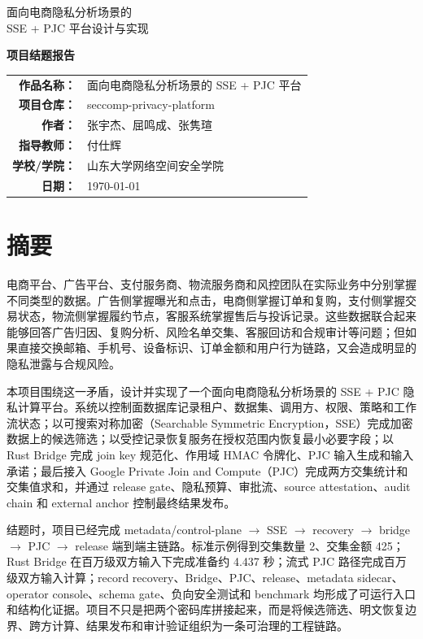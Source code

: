 \documentclass[UTF8,a4paper,12pt,oneside]{ctexrep}
\newcommand{\project}{seccomp-privacy-platform}
\newcommand{\pipeline}{metadata/control-plane $\rightarrow$ SSE $\rightarrow$ recovery $\rightarrow$ bridge $\rightarrow$ PJC $\rightarrow$ release}
\begin{document}
\begin{titlepage}
  \centering
  \vspace*{1.5cm}
  {\heiti 面向电商隐私分析场景的\\[0.3em]SSE + PJC 平台设计与实现\par}
  \vspace{2.8cm}
  {\bfseries 项目结题报告\par}
  \vspace{4.8cm}
  \begin{tabular}{>{\bfseries}r l}
    作品名称： & 面向电商隐私分析场景的 SSE + PJC 平台 \\
    项目仓库： & \project \\
    作者： & 张宇杰、屈鸣成、张隽瑄 \\
    指导教师： & 付仕辉 \\
    学校/学院： & 山东大学网络空间安全学院 \\
    日期： & \today \\
  \end{tabular}
  \vfill
\end{titlepage}


\chapter*{摘要}

电商平台、广告平台、支付服务商、物流服务商和风控团队在实际业务中分别掌握不同类型的数据。广告侧掌握曝光和点击，电商侧掌握订单和复购，支付侧掌握交易状态，物流侧掌握履约节点，客服系统掌握售后与投诉记录。这些数据联合起来能够回答广告归因、复购分析、风险名单交集、客服回访和合规审计等问题；但如果直接交换邮箱、手机号、设备标识、订单金额和用户行为链路，又会造成明显的隐私泄露与合规风险。

本项目围绕这一矛盾，设计并实现了一个面向电商隐私分析场景的 SSE + PJC 隐私计算平台。系统以控制面数据库记录租户、数据集、调用方、权限、策略和工作流状态；以可搜索对称加密（Searchable Symmetric Encryption，SSE）完成加密数据上的候选筛选；以受控记录恢复服务在授权范围内恢复最小必要字段；以 Rust Bridge 完成 join key 规范化、作用域 HMAC 令牌化、PJC 输入生成和输入承诺；最后接入 Google Private Join and Compute（PJC）完成两方交集统计和交集值求和，并通过 release gate、隐私预算、审批流、source attestation、audit chain 和 external anchor 控制最终结果发布。

结题时，项目已经完成 \pipeline{} 端到端主链路。标准示例得到交集数量 2、交集金额 425；Rust Bridge 在百万级双方输入下完成准备约 4.437 秒；流式 PJC 路径完成百万级双方输入计算；record recovery、Bridge、PJC、release、metadata sidecar、operator console、schema gate、负向安全测试和 benchmark 均形成了可运行入口和结构化证据。项目不只是把两个密码库拼接起来，而是将候选筛选、明文恢复边界、跨方计算、结果发布和审计验证组织为一条可治理的工程链路。
\end{document}
